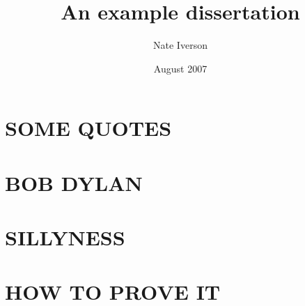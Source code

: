 \documentclass{BGSU}
\title{An example dissertation}
\author{Nate Iverson}
\date{August 2007}
\numberwithin{equation}{chapter}
\begin{document}
\frontmatter %

\maketitle

\copyrightpage %

\begin{abstract}

\end{abstract}

\begin{dedication}

\end{dedication}

\begin{acknowledgments}

\end{acknowledgments}

\tableofcontents

\listoffigures

\listoftables

\begin{preface}

\end{preface}

\mainmatter %

\chapter{\texorpdfstring{SOME QUOTES}{}}


\chapter{\texorpdfstring{BOB DYLAN}{}}


\chapter{\texorpdfstring{SILLYNESS}{}}


\chapter{\texorpdfstring{HOW TO PROVE IT}{}}

\end{document}
